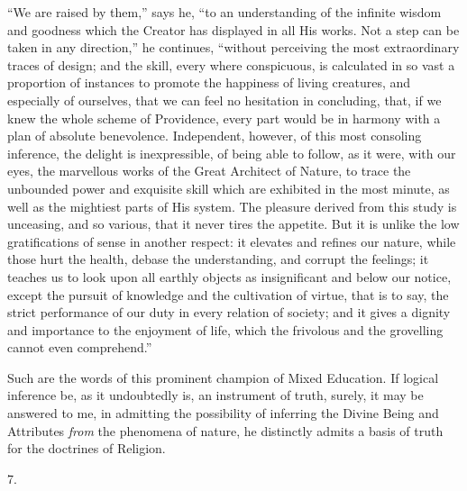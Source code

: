 ``We are raised by them,'' says he, ``to an
understanding of the infinite wisdom and goodness which the Creator
has displayed in all His works. Not a step can be taken in any
direction,'' he continues, ``without perceiving the most
extraordinary traces of design; and the skill, every where
conspicuous, is calculated in so vast a proportion of instances to
promote the happiness of living creatures, and especially of
ourselves, that we can feel no hesitation in concluding, that, if we
knew the whole scheme of Providence, every part would be in harmony
with a plan of absolute benevolence. Independent, however, of this
most consoling inference, the delight is inexpressible, of being able
to follow, as it were, with our eyes, the marvellous works of the
Great Architect of Nature, to trace the unbounded power and exquisite
skill which are exhibited in the most minute, as well as the mightiest
parts of His system. The pleasure derived from this study is
unceasing, and so various, that it never tires the appetite. But it is
unlike the low gratifications of sense in another respect: it elevates
and refines our nature, while those hurt the health, debase the
understanding, and corrupt the feelings; it teaches us to look upon
all earthly objects as insignificant and below our notice, except the
pursuit of knowledge and the cultivation of virtue, that is to say,
the strict performance of our duty in every relation of society; and
it gives a dignity and importance to the enjoyment of life, which the
frivolous and the grovelling cannot even comprehend.''

Such are the words of this prominent champion of Mixed Education.
If logical inference be, as it undoubtedly is, an instrument of truth,
surely, it may be answered to me, in admitting the possibility of
inferring the Divine Being and Attributes \emph{from} the phenomena of
nature, he distinctly admits a basis of truth for the doctrines of
Religion.

7.

